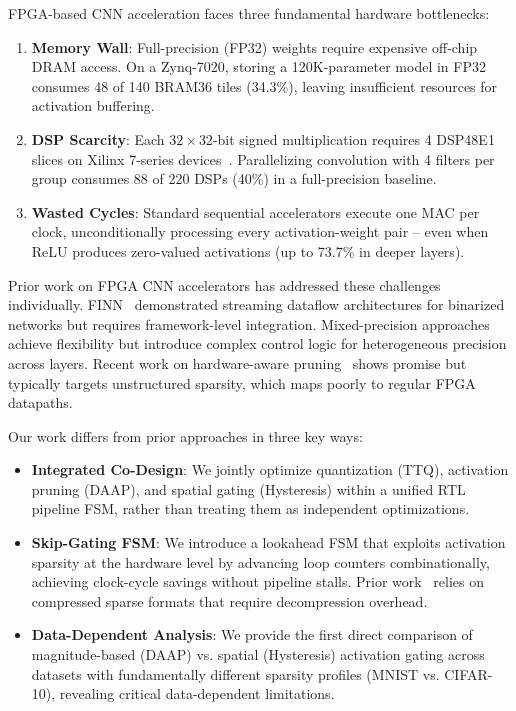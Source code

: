 \documentclass[conference]{IEEEtran}
\begin{document}
FPGA-based CNN acceleration faces three fundamental hardware bottlenecks:

\begin{enumerate}[nosep]
    \item \textbf{Memory Wall}: Full-precision (FP32) weights require expensive off-chip DRAM access. On a Zynq-7020, storing a 120K-parameter model in FP32 consumes 48 of 140 BRAM36 tiles (34.3\%), leaving insufficient resources for activation buffering.
    \item \textbf{DSP Scarcity}: Each $32\times32$-bit signed multiplication requires 4 DSP48E1 slices on Xilinx 7-series devices~\cite{xilinx_zynq}. Parallelizing convolution with 4 filters per group consumes 88 of 220 DSPs (40\%) in a full-precision baseline.
    \item \textbf{Wasted Cycles}: Standard sequential accelerators execute one MAC per clock, unconditionally processing every activation-weight pair -- even when ReLU produces zero-valued activations (up to 73.7\% in deeper layers).
\end{enumerate}

Prior work on FPGA CNN accelerators has addressed these challenges individually. FINN~\cite{umuroglu2017,blott2018} demonstrated streaming dataflow architectures for binarized networks but requires framework-level integration. Mixed-precision approaches~\cite{wang2019,sharma2018} achieve flexibility but introduce complex control logic for heterogeneous precision across layers. Recent work on hardware-aware pruning~\cite{han2016,guo2017} shows promise but typically targets unstructured sparsity, which maps poorly to regular FPGA datapaths.

Our work differs from prior approaches in three key ways:

\begin{itemize}[nosep]
    \item \textbf{Integrated Co-Design}: We jointly optimize quantization (TTQ), activation pruning (DAAP), and spatial gating (Hysteresis) within a unified RTL pipeline FSM, rather than treating them as independent optimizations.
    \item \textbf{Skip-Gating FSM}: We introduce a lookahead FSM that exploits activation sparsity at the hardware level by advancing loop counters combinationally, achieving clock-cycle savings without pipeline stalls. Prior work~\cite{han2016,albericio2016} relies on compressed sparse formats that require decompression overhead.
    \item \textbf{Data-Dependent Analysis}: We provide the first direct comparison of magnitude-based (DAAP) vs. spatial (Hysteresis) activation gating across datasets with fundamentally different sparsity profiles (MNIST vs. CIFAR-10), revealing critical data-dependent limitations.
\end{itemize}
\end{document}
